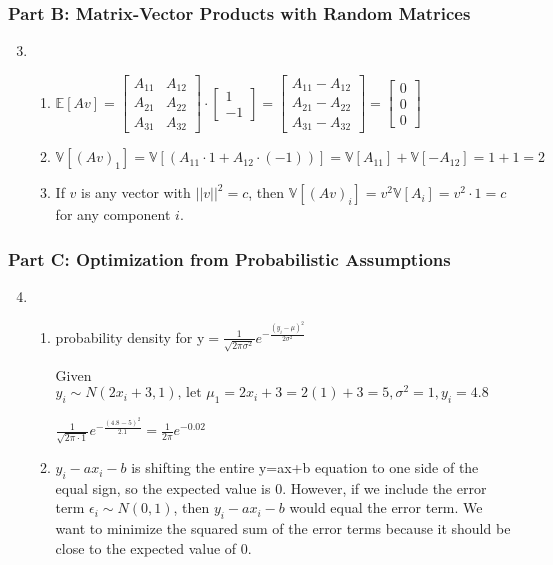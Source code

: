\documentclass[12pt]{article}
\begin{document}
\subsubsection{Part B: Matrix-Vector Products with Random Matrices}
\begin{enumerate}
	\setcounter{enumi}{2}
	\item \begin{enumerate}
		\item $\mathbb{E}[Av] = \begin{bmatrix}
	A_{11} & A_{12} \\
	A_{21} & A_{22} \\
	A_{31} & A_{32} 
	\end{bmatrix} \cdot \begin{bmatrix}
	1 \\ -1
	\end{bmatrix} = \begin{bmatrix}
	A_{11} - A_{12} \\
	A_{21} - A_{22} \\
	A_{31} - A_{32} 
	\end{bmatrix}= \begin{bmatrix}
	0 \\ 0 \\ 0
	\end{bmatrix}
	$
	\item $\mathbb{V}[(Av)_1] = \mathbb{V}[(A_{11} \cdot 1 + A_{12} \cdot (-1))] = \mathbb{V}[A_{11}] + \mathbb{V}[-A_{12}] = 1+1=2$
	\item If $v$ is any vector with $||v||^2=c$, then $\mathbb{V}[(Av)_i] = v^2\mathbb{V}[A_i] = v^2 \cdot 1 = c$ for any component $i$.
	\end{enumerate}
\end{enumerate}
\subsubsection{Part C: Optimization from Probabilistic Assumptions}
\begin{enumerate}
	\setcounter{enumi}{3}
	\item \begin{enumerate}
		\item probability density for y$= \frac{1}{\sqrt{2\pi\sigma^2}}e^{-\frac{(y_i-\mu)^2}{2\sigma^2}}$
	
	Given $y_i \sim N(2x_i+3,1) \text{, let } \mu_1=2x_i+3 = 2(1)+3 = 5, \sigma^2 = 1, y_i = 4.8$
	
	$\frac{1}{\sqrt{2\pi \cdot 1}}e^{-\frac{(4.8-5)^2}{2.1}}=\frac{1}{2\pi}e^{-0.02}$
	\item $y_i-ax_i-b$ is shifting the entire y=ax+b equation to one side of the equal sign, so the expected value is 0. However, if we include the error term $\epsilon_i \sim N(0,1)$, then $y_i-ax_i-b$ would equal the error term. We want to minimize the squared sum of the error terms because it should be close to the expected value of 0.
\end{enumerate}
\end{enumerate}
\end{document}
